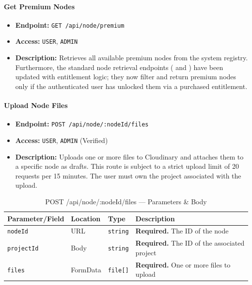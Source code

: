 \paragraph{Get Premium Nodes}
\label{subsubsec:get-premium-nodes}

\begin{itemize}
  \item \textbf{Endpoint:} \texttt{GET /api/node/premium}
  \item \textbf{Access:} \texttt{USER}, \texttt{ADMIN}
  \item \textbf{Description:} Retrieves all available premium nodes from the system registry. Furthermore, the standard node retrieval endpoints (\texttt{} and \texttt{}) have been updated with entitlement logic; they now filter and return premium nodes only if the authenticated user has unlocked them via a purchased entitlement.
\end{itemize}
\paragraph{Upload Node Files}
\label{subsubsec:upload-node-files}

\begin{itemize}
  \item \textbf{Endpoint:} \texttt{POST /api/node/:nodeId/files}
  \item \textbf{Access:} \texttt{USER}, \texttt{ADMIN} (Verified)
  \item \textbf{Description:} Uploads one or more files to Cloudinary and attaches them to a specific node as drafts.
  This route is subject to a strict upload limit of 20 requests per 15 minutes.
  The user must own the project associated with the upload.
\end{itemize}

\begin{table}[H]
\centering
\renewcommand{\arraystretch}{1.3}
\begin{tabularx}{\textwidth}{|l|l|l|X|}
\hline
\textbf{Parameter/Field} & \textbf{Location} & \textbf{Type} & \textbf{Description} \\
\hline
\texttt{nodeId}      & URL      & \texttt{string}  & \textbf{Required.} The ID of the node \\
\hline
\texttt{projectId}   & Body     & \texttt{string}  & \textbf{Required.} The ID of the associated project \\
\hline
\texttt{files}       & FormData & \texttt{file[]}  & \textbf{Required.} One or more files to upload \\
\hline
\end{tabularx}
\caption{POST /api/node/:nodeId/files — Parameters \& Body}
\label{tab:upload-node-files-params}
\end{table}

